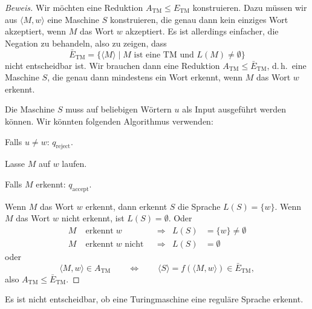 \begin{proof}[Beweis]
Wir möchten eine Reduktion $A_{\text{TM}}\le E_{\text{TM}}$ konstruieren.
Dazu müssen wir aus $\langle M,w\rangle$ eine Maschine $S$ konstruieren,
die genau dann kein einziges Wort akzeptiert, wenn $M$ das Wort $w$
akzeptiert.
Es ist allerdings einfacher, die Negation zu behandeln,
also zu zeigen, dass 
\[
\bar E_{\text{TM}}=
\{ \langle M\rangle\;|\; \text{$M$ ist eine TM und $L(M)\ne\emptyset$}\}
\]
nicht entscheidbar ist.
Wir brauchen dann eine Reduktion
$A_{\text{TM}}\le \bar E_{\text{TM}}$, d.\,h.~eine Maschine $S$,
die genau dann mindestens ein Wort erkennt, wenn $M$ das Wort $w$ 
erkennt.

Die Maschine $S$ muss auf beliebigen Wörtern $u$ als Input ausgeführt
werden können.
Wir könnten folgenden Algorithmus verwenden:
\medskip
\begin{compactenum}
\item Falls $u\ne w$: $q_{\text{reject}}$.
\item Lasse $M$ auf $w$ laufen.
\item Falls $M$ erkennt: $q_{\text{accept}}$.
\end{compactenum}
\medskip
Wenn $M$ das Wort $w$ erkennt, dann erkennt $S$ die Sprache 
$L(S)=\{w\}$.
Wenn $M$ das Wort $w$ nicht erkennt, ist $L(S)=\emptyset$.
Oder
\begin{align*}
M&\operatorname{erkennt}w              &&\Rightarrow&L(S)&=\{w\}\ne \emptyset
\\
M&\operatorname{erkennt}w\text{ nicht} &&\Rightarrow&L(S)&=\emptyset
\end{align*}
oder
\[
\langle M,w\rangle \in A_{\text{TM}}
\qquad
\Leftrightarrow
\qquad
\langle S\rangle = f(\langle M,w\rangle)\in
\bar E_{\text{TM}},
\]
also $A_{\text{TM}}\le \bar E_{\text{TM}}$.
\end{proof}

\begin{satz}
Es ist nicht entscheidbar, ob eine Turingmaschine eine reguläre
Sprache erkennt.
\end{satz}

